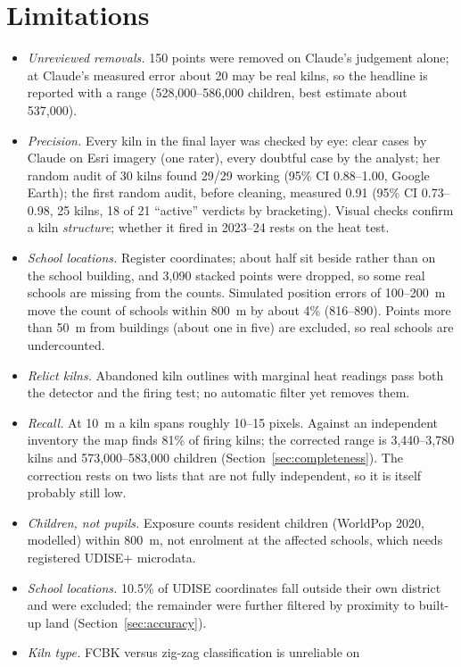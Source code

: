 \documentclass[11pt,a4paper]{article}
\begin{document}
\section{Limitations}
\begin{itemize}[leftmargin=*]
\item \emph{Unreviewed removals.} 150 points were removed on Claude's judgement
alone; at Claude's measured error about 20 may be real kilns, so the headline is
reported with a range (528{,}000--586{,}000 children, best estimate about 537{,}000).
\item \emph{Precision.} Every kiln in the final layer was checked by eye: clear
cases by Claude on Esri imagery (one rater), every doubtful case by the analyst;
her random audit of 30 kilns found 29/29 working (95\% CI 0.88--1.00, Google
Earth); the first random audit, before cleaning, measured 0.91 (95\% CI 0.73--0.98,
25 kilns, 18 of 21 ``active'' verdicts by bracketing). Visual checks confirm a
kiln \emph{structure}; whether it fired in 2023--24 rests on the heat test.
\item \emph{School locations.} Register coordinates; about half sit beside
rather than on the school building, and 3{,}090 stacked points were dropped, so
some real schools are missing from the counts. Simulated position errors of
100--200~m move the count of schools within 800~m by about 4\% (816--890). Points more than 50~m from buildings (about one in five) are excluded, so real schools are undercounted.
\item \emph{Relict kilns.} Abandoned kiln outlines with marginal heat readings
pass both the detector and the firing test; no automatic filter yet removes
them.
\item \emph{Recall.} At 10~m a kiln spans roughly 10--15 pixels. Against an
independent inventory the map finds 81\% of firing kilns; the corrected range is
3{,}440--3{,}780 kilns and 573{,}000--583{,}000 children
(Section~\ref{sec:completeness}). The correction rests on two lists that are not
fully independent, so it is itself probably still low.
\item \emph{Children, not pupils.} Exposure counts resident children (WorldPop
2020, modelled) within 800~m, not enrolment at the affected schools, which
needs registered UDISE+ microdata.
\item \emph{School locations.} 10.5\% of UDISE coordinates fall outside their
own district and were excluded; the remainder were further filtered by
proximity to built-up land (Section~\ref{sec:accuracy}).
\item \emph{Kiln type.} FCBK versus zig-zag classification is unreliable on

\end{itemize}
\end{document}
